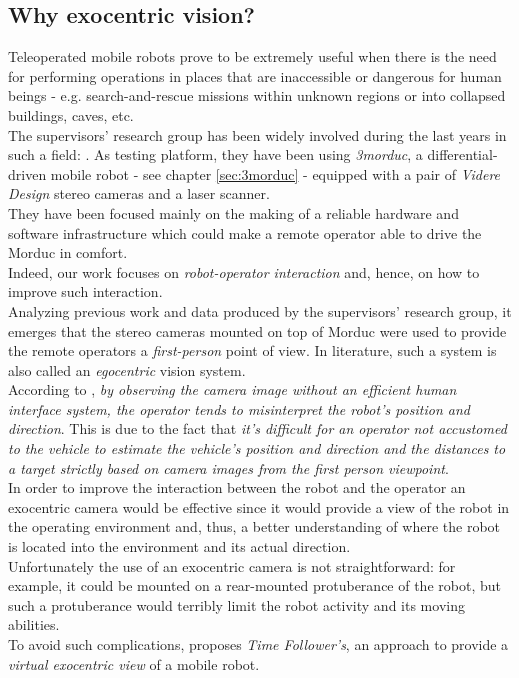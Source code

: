 \subsection{Why exocentric vision?}
\label{sec:exo:why_exocetric}

Teleoperated mobile robots prove to be extremely useful 
when there is the need for performing operations in places that 
are inaccessible or dangerous for human beings - e.g. 
search-and-rescue missions within unknown regions or into 
collapsed buildings, caves, etc.
\\
The supervisors' research group has been widely involved 
during the last years in such a field: \cite{livatino2010}.
As testing platform, they have been using \textit{3morduc},
a differential-driven mobile robot - see chapter \ref{sec:3morduc} -
equipped with a pair of \textit{Videre Design} \cite{videredesign} 
stereo cameras and a laser scanner.
\\
They have been focused 
mainly on the making of a reliable hardware and software 
infrastructure which could make a remote operator able to drive 
the Morduc in comfort.
\\
Indeed, our work focuses on \textit{robot-operator interaction} and, 
hence, on how to improve such interaction. 
\\
Analyzing previous work and data produced by the supervisors' 
research group, it emerges that the stereo cameras mounted on 
top of Morduc were used to provide the remote operators a 
\textit{first-person} point of view. In literature, such a 
system is also called an \textit{egocentric} vision system.
\\
According to \cite{sugimoto}, \textit{by observing the camera image 
without an efficient human interface system, the operator 
tends to misinterpret the robot's position and direction}. This is 
due to the fact that \textit{it's difficult for an
operator not accustomed to the vehicle to estimate the
vehicle's position and direction and the distances to a
target strictly based on camera images from the first person 
viewpoint}.
\\
In order to improve the interaction between the robot and the operator 
an exocentric camera would be effective since it would provide a 
view of the robot in the operating environment and, thus, 
a better understanding of where the robot is located into the
environment and its actual direction.
\\
Unfortunately the use of an exocentric camera is not straightforward: 
for example, it could be mounted on a rear-mounted protuberance of the 
robot, but such a protuberance would terribly limit the robot activity and 
its moving abilities.
\\
To avoid such complications, \cite{sugimoto} proposes 
\textit{Time Follower's}, an approach to provide a \textit{virtual exocentric 
view} of a mobile robot.
